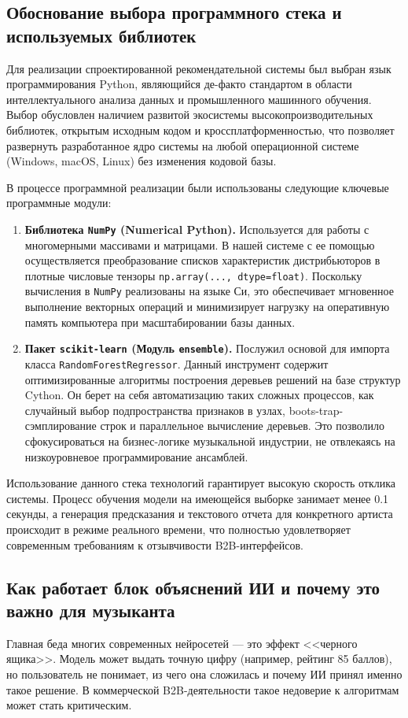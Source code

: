 \documentclass[14pt, a4paper]{extarticle}
\begin{document}
\subsection{Обоснование выбора программного стека и используемых библиотек}
Для реализации спроектированной рекомендательной системы был выбран язык программирования Python, являющийся де-факто стандартом в области интеллектуального анализа данных и промышленного машинного обучения. Выбор обусловлен наличием развитой экосистемы высокопроизводительных библиотек, открытым исходным кодом и кроссплатформенностью, что позволяет развернуть разработанное ядро системы на любой операционной системе (Windows, macOS, Linux) без изменения кодовой базы.

В процессе программной реализации были использованы следующие ключевые программные модули:
\begin{enumerate}
    \item \textbf{Библиотека \texttt{NumPy} (Numerical Python).} Используется для работы с многомерными массивами и матрицами. В нашей системе с ее помощью осуществляется преобразование списков характеристик дистрибьюторов в плотные числовые тензоры \texttt{np.array(..., dtype=float)}. Поскольку вычисления в \texttt{NumPy} реализованы на языке Си, это обеспечивает мгновенное выполнение векторных операций и минимизирует нагрузку на оперативную память компьютера при масштабировании базы данных.
    \item \textbf{Пакет \texttt{scikit-learn} (Модуль \texttt{ensemble}).} Послужил основой для импорта класса \texttt{RandomForestRegressor}. Данный инструмент содержит оптимизированные алгоритмы построения деревьев решений на базе структур Cython. Он берет на себя автоматизацию таких сложных процессов, как случайный выбор подпространства признаков в узлах, boots-trap-сэмплирование строк и параллельное вычисление деревьев. Это позволило сфокусироваться на бизнес-логике музыкальной индустрии, не отвлекаясь на низкоуровневое программирование ансамблей.
\end{enumerate}
Использование данного стека технологий гарантирует высокую скорость отклика системы. Процесс обучения модели на имеющейся выборке занимает менее 0.1 секунды, а генерация предсказания и текстового отчета для конкретного артиста происходит в режиме реального времени, что полностью удовлетворяет современным требованиям к отзывчивости B2B-интерфейсов.


\subsection{Как работает блок объяснений ИИ и почему это важно для музыканта}
Главная беда многих современных нейросетей — это эффект <<черного ящика>>. Модель может выдать точную цифру (например, рейтинг 85 баллов), но пользователь не понимает, из чего она сложилась и почему ИИ принял именно такое решение. В коммерческой B2B-деятельности такое недоверие к алгоритмам может стать критическим.
\end{document}
